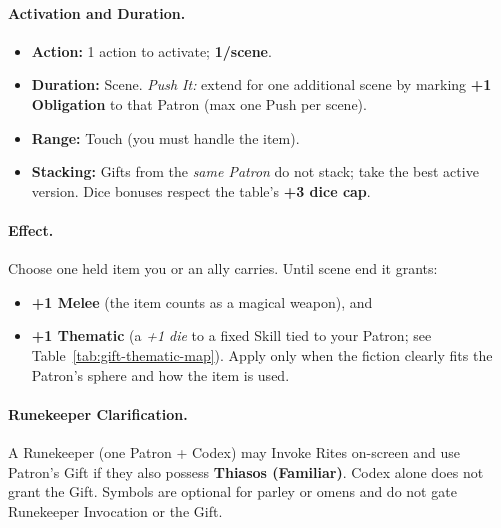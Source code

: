 \paragraph{Activation and Duration.}
\begin{itemize}
  \item \textbf{Action:} 1 action to activate; \textbf{1/scene}.
  \item \textbf{Duration:} Scene. \emph{Push It:} extend for one additional scene by marking \textbf{+1 Obligation} to that Patron (max one Push per scene).
  \item \textbf{Range:} Touch (you must handle the item).
  \item \textbf{Stacking:} Gifts from the \emph{same Patron} do not stack; take the best active version. Dice bonuses respect the table's \textbf{+3 dice cap}.
\end{itemize}

\paragraph{Effect.}
Choose one held item you or an ally carries. Until scene end it grants:
\begin{itemize}
  \item \textbf{+1 Melee} (the item counts as a magical weapon), and
  \item \textbf{+1 Thematic} (a \emph{+1 die} to a fixed Skill tied to your Patron; see Table~\ref{tab:gift-thematic-map}). Apply only when the fiction clearly fits the Patron's sphere and how the item is used.
\end{itemize}

\paragraph{Runekeeper Clarification.}
A Runekeeper (one Patron + Codex) may Invoke Rites on-screen and use Patron's Gift if they also possess \textbf{Thiasos (Familiar)}. Codex alone does not grant the Gift. Symbols are optional for parley or omens and do not gate Runekeeper Invocation or the Gift.

